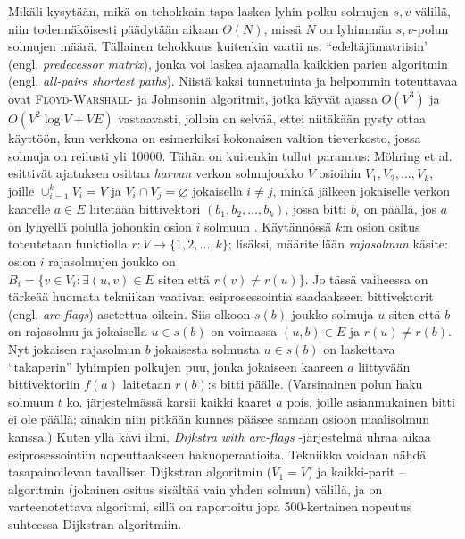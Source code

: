 \documentclass[12pt]{article}
\begin{document}
Mikäli kysytään, mikä on tehokkain tapa laskea lyhin polku solmujen $s, v$ välillä, niin todennäköisesti päädytään aikaan $\Theta(N)$, missä $N$ on lyhimmän $s, v$-polun solmujen määrä. Tällainen tehokkuus kuitenkin vaatii ns. ``edeltäjämatriisin' (engl. \textit{predecessor matrix}), jonka voi laskea ajaamalla kaikkien parien algoritmin (engl. \textit{all-pairs shortest paths}). Niistä kaksi tunnetuinta ja helpommin toteuttavaa ovat \textsc{Floyd-Warshall}- ja Johnsonin algoritmit, jotka käyvät ajassa $O(V^3)$ ja $O(V^2 \log V + VE)$ vastaavasti, jolloin on selvää, ettei niitäkään pysty ottaa käyttöön, kun verkkona on esimerkiksi kokonaisen valtion tieverkosto, jossa solmuja on reilusti yli 10000. Tähän on kuitenkin tullut parannus: Möhring et al. esittivät ajatuksen osittaa \textit{harvan} verkon solmujoukko $V$ osioihin $V_1, V_2, \dots, V_k$, joille $\cup_{i = 1}^k V_i = V$ ja $V_i \cap V_j = \varnothing$ jokaisella $i \neq j$, minkä jälkeen jokaiselle verkon kaarelle $a \in E$ liitetään bittivektori $(b_1, b_2, \dots, b_k)$, jossa bitti $b_i$ on päällä, jos $a$ on lyhyellä polulla johonkin osion $i$ solmuun \cite{Mohring07}. Käytännössä $k$:n osion ositus toteutetaan funktiolla $r \colon V \to \{1, 2, \dots, k\}$; lisäksi, määritellään \textit{rajasolmun} käsite: osion $i$ rajasolmujen joukko on $B_i = \{v \in V_i \colon \exists(u, v) \in E \text{ siten että } r(v) \neq r(u) \}$. Jo tässä vaiheessa on tärkeää huomata tekniikan vaativan esiprosessointia saadaakseen bittivektorit (engl. \textit{arc-flags}) asetettua oikein. Siis olkoon $s(b)$ joukko solmuja $u$ siten että $b$ on rajasolmu ja jokaisella $u \in s(b)$ on voimassa $(u, b) \in E$ ja $r(u) \neq r(b)$. Nyt jokaisen rajasolmun $b$ jokaisesta solmusta $u \in s(b)$ on laskettava ``takaperin'' lyhimpien polkujen puu, jonka jokaiseen kaareen $a$ liittyvään bittivektoriin $f(a)$ laitetaan $r(b)$:s bitti päälle. (Varsinainen polun haku solmuun $t$ ko. järjestelmässä karsii kaikki kaaret $a$ pois, joille asianmukainen bitti ei ole päällä; ainakin niin pitkään kunnes pääsee samaan osioon maalisolmun kanssa.) Kuten yllä kävi ilmi, \textit{Dijkstra with arc-flags} -järjestelmä uhraa aikaa esiprosessointiin nopeuttaakseen hakuoperaatioita. Tekniikka voidaan nähdä tasapainoilevan tavallisen Dijkstran algoritmin ($V_1 = V$) ja kaikki-parit --algoritmin (jokainen ositus sisältää vain yhden solmun) välillä, ja on varteenotettava algoritmi, sillä on raportoitu jopa 500-kertainen nopeutus suhteessa Dijkstran algoritmiin. 
\end{document}
